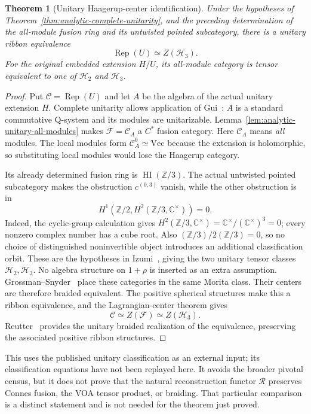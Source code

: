 \documentclass[11pt,a4paper]{article}
\newtheorem{theorem}{Theorem}[section]
\theoremstyle{definition}
\DeclareMathOperator{\Rep}{Rep}
\renewcommand{\Vec}{\mathrm{Vec}}
\newcommand{\HH}{\mathcal H}
\begin{document}
\begin{theorem}[Unitary Haagerup-center identification]
\label{thm:analytic-category}
Under the hypotheses of Theorem~\ref{thm:analytic-complete-unitarity},
and the preceding determination of the all-module fusion ring and its
untwisted pointed subcategory, there is a unitary ribbon equivalence
\[
 \Rep(U)\simeq Z(\HH_3).
\]
For the original embedded extension $H/U$, its all-module category is
tensor equivalent to one of $\HH_2$ and $\HH_3$.
\end{theorem}
\begin{proof}
Put $\mathcal C=\Rep(U)$ and let $A$ be the algebra of the actual
unitary extension $H$.  Complete unitarity allows application of
Gui~\cite[Theorems~2.21 and~2.28]{Gui}: $A$ is a standard commutative
Q-system and its modules are unitarizable.
Lemma~\ref{lem:analytic-unitary-all-modules} makes
$\mathcal F=\mathcal C_A$ a $C^*$ fusion category.  Here $\mathcal C_A$ means
\emph{all} modules.  The local modules form $\mathcal C_A^0\simeq\Vec$
because the extension is holomorphic, so substituting local modules
would lose the Haagerup category.

Its already determined fusion ring is
$\operatorname{HI}(\mathbb Z/3)$.  The actual untwisted pointed
subcategory makes the obstruction $c^{(0,3)}$ vanish, while the other
obstruction is in
\[
 H^1\!\left(\mathbb Z/2,H^2(\mathbb Z/3,\mathbb C^\times)\right)=0.
\]
Indeed, the cyclic-group calculation gives
$H^2(\mathbb Z/3,\mathbb C^\times)=
\mathbb C^\times/(\mathbb C^\times)^3=0$;
every nonzero complex number has a cube root.  Also
$(\mathbb Z/3)/2(\mathbb Z/3)=0$, so no choice of distinguished
noninvertible object introduces an additional classification orbit.
These are the hypotheses in
Izumi~\cite[Definition~2.7 and Theorems~5.9 and~9.1]{Izumi}, giving the two
unitary tensor classes $\HH_2,\HH_3$.  No algebra structure on
$1+\rho$ is inserted as an extra assumption.
Grossman--Snyder~\cite[Theorem~1.4]{GS} place these categories in the same
Morita class.  Their centers are therefore braided equivalent.
The positive spherical structures make this a ribbon equivalence, and
the Lagrangian-center theorem gives
\[
 \mathcal C\simeq Z(\mathcal F)\simeq Z(\HH_3).
\]
Reutter~\cite[Theorem~5]{Reutter} provides the unitary braided realization of the
equivalence, preserving the associated positive ribbon structures.
\end{proof}

This uses the published unitary classification as an external input;
its classification equations have not been replayed here.  It avoids
the broader pivotal census, but it does not prove that the natural
reconstruction functor $\mathcal R$ preserves Connes fusion, the VOA
tensor product, or braiding.  That particular comparison is a distinct
statement and is not needed for the theorem just proved.
\end{document}
